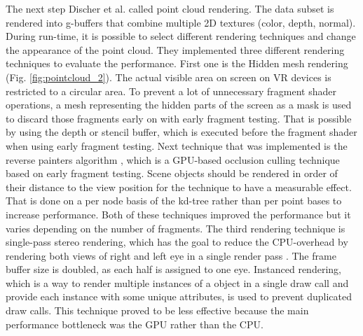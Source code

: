 \documentclass[10pt,twocolumn,letterpaper]{article}
\begin{document}
\setlength{\parindent}{1pc}The next step Discher et al. \cite{discher_point-based_2018} called point cloud rendering. The data subset is rendered into g-buffers that combine multiple 2D textures (color, depth, normal). During run-time, it is possible to select different rendering techniques and change the appearance of the point cloud. They implemented three different rendering techniques to evaluate the performance. First one is the Hidden mesh rendering (Fig. \ref{fig:pointcloud_2}). The actual visible area on screen on VR devices is restricted to a circular area. To prevent a lot of unnecessary fragment shader operations, a mesh representing the hidden parts of the screen as a mask is used to discard those fragments early on \cite{vlachos_advanced_2015} with early fragment testing. That is possible by using the depth or stencil buffer, which is executed before the fragment shader when using early fragment testing. Next technique that was implemented is the reverse painters algorithm \cite{foley1996computer}, which is a GPU-based occlusion culling technique based on early fragment testing. Scene objects should be rendered in order of their distance to the view position for the technique to have a measurable effect. That is done on a per node basis of the kd-tree rather than per point bases to increase performance. Both of these techniques improved the performance but it varies depending on the number of fragments. The third rendering technique is single-pass stereo rendering, which has the goal to reduce the CPU-overhead by rendering both views of right and left eye in a single render pass \cite{johansson2016efficient}. The frame buffer size is doubled, as each half is assigned to one eye. Instanced rendering, which is a way to render multiple instances of a object in a single draw call and provide each instance with some unique attributes, is used to prevent duplicated draw calls. This technique proved to be less effective because the main performance bottleneck was the GPU rather than the CPU. 
\end{document}
